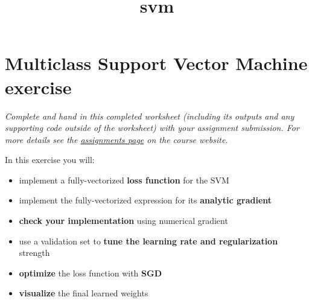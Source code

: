 \documentclass[11pt]{article}
\title{svm}
\providecommand{\tightlist}{%
      \setlength{\itemsep}{0pt}\setlength{\parskip}{0pt}}
\begin{document}
    
    \maketitle
    
    

    
    \hypertarget{multiclass-support-vector-machine-exercise}{%
\section{Multiclass Support Vector Machine
exercise}\label{multiclass-support-vector-machine-exercise}}

\emph{Complete and hand in this completed worksheet (including its
outputs and any supporting code outside of the worksheet) with your
assignment submission. For more details see the
\href{http://vision.stanford.edu/teaching/cs231n/assignments.html}{assignments
page} on the course website.}

In this exercise you will:

\begin{itemize}
\tightlist
\item
  implement a fully-vectorized \textbf{loss function} for the SVM
\item
  implement the fully-vectorized expression for its \textbf{analytic
  gradient}
\item
  \textbf{check your implementation} using numerical gradient
\item
  use a validation set to \textbf{tune the learning rate and
  regularization} strength
\item
  \textbf{optimize} the loss function with \textbf{SGD}
\item
  \textbf{visualize} the final learned weights
\end{itemize}
\end{document}
